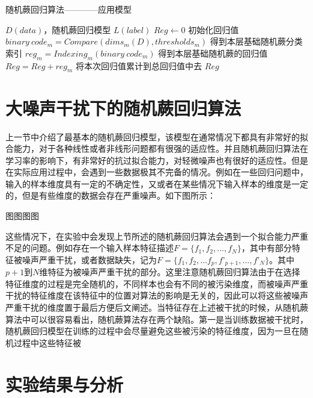 \begin{algorithm}
\caption{随机蕨回归算法————应用模型}
\begin{algorithmic}[1]
\Require $D(data)$，随机蕨回归模型
\Ensure $L(label)$
\State $Reg\leftarrow 0$
\Comment 初始化回归值
	\State $binary\ code_m=Compare(dims_m(D), thresholds_m)$
	\Comment 得到本层基础随机蕨分类索引
	\State $reg_m=Indexing_m(binary\ code_m)$
	\Comment 得到本层基础随机蕨的回归值
	\State $Reg=Reg+reg_m$
	\Comment 将本次回归值累计到总回归值中去
\EndFor
\State \Return $Reg$
\end{algorithmic}
\end{algorithm}




\section{大噪声干扰下的随机蕨回归算法}

上一节中介绍了最基本的随机蕨回归模型，该模型在通常情况下都具有非常好的拟合能力，对于各种线性或者非线形问题都有很强的适应性。并且随机蕨回归算法在学习率的影响下，有非常好的抗过拟合能力，对轻微噪声也有很好的适应性。但是在实际应用过程中，会遇到一些数据极其不完备的情况。例如在一些回归问题中，输入的样本维度具有一定的不确定性，又或者在某些情况下输入样本的维度是一定的，但是有些维度的数据会存在严重噪声。如下图所示：

图图图图

这些情况下，在实验中会发现上节所述的随机蕨回归算法会遇到一个拟合能力严重不足的问题。例如存在一个输入样本特征描述$F=\{f_1,f_2,...,f_N\}$，其中有部分特征被噪声严重干扰，或者数据缺失，记为$F=\{f_1,f_2,...f_p,f’_{p+1},...,f’_N\}$。其中$p+1$到$N$维特征为被噪声严重干扰的部分。这里注意随机蕨回归算法由于在选择特征维度的过程是完全随机的，不同样本也会有不同的被污染维度，而被噪声严重干扰的特征维度在该特征中的位置对算法的影响是无关的，因此可以将这些被噪声严重干扰的维度置于最后方便后文阐述。当特征存在上述被干扰的时候，从随机蕨算法中可以很容易看出，随机蕨算法存在两个缺陷。第一是当训练数据被干扰时，随机蕨回归模型在训练的过程中会尽量避免这些被污染的特征维度，因为一旦在随机过程中这些特征被

\section{实验结果与分析} %





























